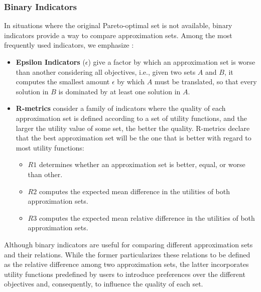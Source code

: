 	\subsubsection{Binary Indicators}
	In situations where the original Pareto-optimal set is not available, binary indicators provide a way to compare approximation sets. Among the most frequently used indicators, we emphasize \cite{Zitzler2003Metrics,Li2017Rmetrics}:
	\begin{itemize}
		
		\item \textbf{Epsilon Indicators} ($\epsilon$) give a factor by which an approximation set is worse than another considering all objectives, i.e., given two sets $A$ and $B$, it computes the smallest amount $\epsilon$ by which $A$ must be translated, so that every solution in $B$ is dominated by at least one solution in $A$.
		
		\item \textbf{R-metrics} consider a family of indicators where the quality of each approximation set is defined according to a set of utility functions, and the larger the utility value of some set, the better the quality. R-metrics declare that the best approximation set will be the one that is better with regard to most utility functions:
		\begin{itemize}
			\item \textbf{$R1$} determines whether an approximation set is better, equal, or worse than other. 
			\item \textbf{$R2$} computes the expected mean difference in the utilities of both approximation sets.
			\item \textbf{$R3$} computes the expected mean relative difference in the utilities of both approximation sets.
		\end{itemize}
	\end{itemize}

	Although binary indicators are useful for comparing different approximation sets and their relations. While the former particularizes these relations to be defined as the relative difference among two approximation sets, the latter incorporates utility functions predefined by users to introduce preferences over the different objectives and, consequently, to influence the quality of each set. 
	
